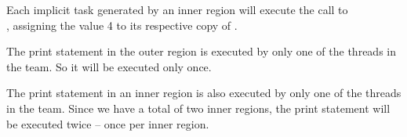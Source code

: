 Each implicit task generated by an inner  region will execute 
the call to\\ , assigning the value 4 to its respective 
copy of .

The print statement in the outer  region is executed by only one 
of the threads in the team. So it will be executed only once.

The print statement in an inner  region is also executed by only 
one of the threads in the team. Since we have a total of two inner  
regions, the print statement will be executed twice -- once per inner  
region.




